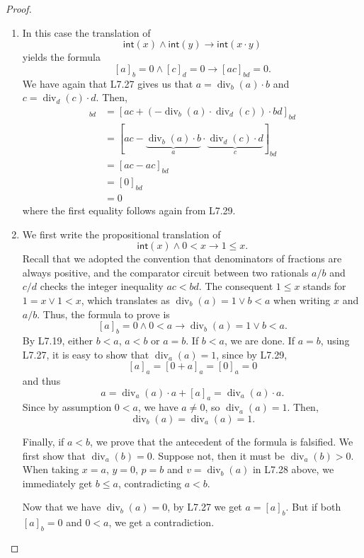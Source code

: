 \documentclass[11pt]{article}
\newcommand{\LAint}{\mathsf{int}}
\theoremstyle{definition}
\theoremstyle{plain}
\theoremstyle{remark}
\begin{document}
\begin{proof}
\begin{enumerate}[leftmargin=1.15cm]
            \item[($\text{Int}_5$)] In this case the translation of
            \[ \LAint(x) \land \LAint(y) \to \LAint(x \cdot y) \]
            yields the formula
            \[ [a]_b = 0 \land [c]_d = 0 \to [ac]_{bd} = 0\text{.} \]
            We have again that L7.27 gives us that $a = \operatorname{div}_b(a)\cdot b$ and $c = \operatorname{div}_d(c)\cdot d$. Then,
            \begin{align*}
                    [ac]_{bd} &= [ac + (-\operatorname{div}_b(a) \cdot \operatorname{div}_d(c)) \cdot bd]_{bd} \\
                    &= [ac - {\underbrace{\operatorname{div}_b(a) \cdot b}_{a}} \cdot {\underbrace{\operatorname{div}_d(c) \cdot d}_{c}}]_{bd} \\
                    &= [ac - ac]_{bd} \\
                    &= [0]_{bd} \\
                    &= 0
                \end{align*}
            where the first equality follows again from L7.29.
            
            \item[($\text{Int}_6$)] We first write the propositional translation of 
            \[ \LAint(x) \land 0 < x \to 1 \leq x\text{.} \]
            Recall that we adopted the convention that denominators of fractions are always positive, and the comparator circuit between two rationals $a/b$ and $c/d$ checks the integer inequality $ac < bd$. The consequent $1 \leq x$ stands for $1 = x \lor 1 < x$, which translates as $\operatorname{div}_b(a) = 1 \lor b < a$ when writing $x$ and $a/b$. Thus, the formula to prove is 
            \[ [a]_b = 0 \land 0 < a \to \operatorname{div}_b(a) = 1 \lor b<a\text{.} \]
            By L7.19, either $b< a$, $a < b$ or $a = b$. If $b < a$, we are done. If $a = b$, using L7.27, it is easy to show that $\operatorname{div}_a(a) = 1$, since by L7.29,
            \[ [a]_a = [0 + a]_a = [0]_a = 0 \]
            and thus
            \[  a = \operatorname{div}_a (a) \cdot a + [a]_a =  \operatorname{div}_a (a) \cdot a\text{.} \]
            Since by assumption $0 < a$, we have $a \neq 0$, so $\operatorname{div}_a(a) = 1$. Then,
            \[ \operatorname{div}_b(a) = \operatorname{div}_a(a) = 1\text{.} \]
            
            Finally, if $a < b$, we prove that the antecedent of the formula is falsified. We first show that $\operatorname{div}_a(b) = 0$. Suppose not, then it must be $\operatorname{div}_a(b) > 0$. 
            When taking $x = a$, $y = 0$, $p = b$ and $v = \operatorname{div}_b(a)$ in L7.28 above, we immediately get $b \leq a$, contradicting $a < b$.

            Now that we have $\operatorname{div}_b(a) = 0$, by L7.27 we get $a = [a]_b$. But if both $[a]_b = 0$ and $0 < a$, we get a contradiction. \qedhere
        \end{enumerate} 
\end{proof}
\end{document}
